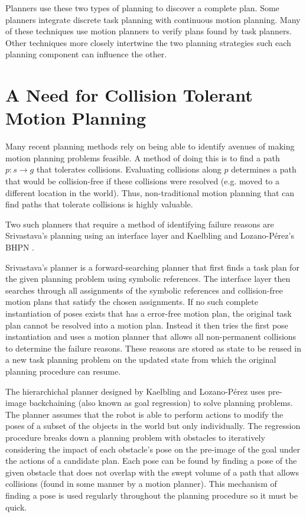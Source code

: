Planners use these two types of planning to discover a complete plan. Some planners integrate discrete task planning with continuous motion planning. Many of these techniques use motion planners to verify plans found by task planners. Other techniques more closely intertwine the two planning strategies such each planning component can influence the other. 

\section{A Need for Collision Tolerant Motion Planning} \label{intro:collisiontolerant}
Many recent planning methods rely on being able to identify avenues of making motion planning problems feasible. A method of doing this is to find a path $p:s \rightarrow g$ that tolerates collisions. Evaluating collisions along $p$ determines a path that would be collision-free if these collisions were resolved (e.g. moved to a different location in the world). Thus, non-traditional motion planning that can find paths that tolerate collisions is highly valuable. 

Two such planners that require a method of identifying failure reasons are Srivastava's planning using an interface layer and Kaelbling and Lozano-P\'{e}rez's BHPN  . 

Srivastava's planner is a forward-searching planner that first finds a task plan for the given planning problem using symbolic references. The interface layer then searches through all assignments of the symbolic references and collision-free motion plans that satisfy the chosen assignments. If no such complete instantiation of poses exists that has a error-free motion plan, the original task plan cannot be resolved into a motion plan. Instead it then tries the first pose instantiation and uses a motion planner that allows all non-permanent collisions to determine the failure reasons. These reasons are stored as state to be reused in a new task planning problem on the updated state from which the original planning procedure can resume. 

The hierarchichal planner designed by Kaelbling and Lozano-P\'{e}rez uses pre-image backchaining (also known as goal regression) to solve planning problems. The planner assumes that the robot is able to perform actions to modify the poses of a subset of the objects in the world but only individually. The regression procedure breaks down a planning problem with obstacles to iteratively considering the impact of each obstacle's pose on the pre-image of the goal under the actions of a candidate plan. Each pose can be found by finding a pose of the given obstacle that does not overlap with the swept volume of a path that allows collisions (found in some manner by a motion planner). This mechanism of finding a pose is used regularly throughout the planning procedure so it must be quick.

